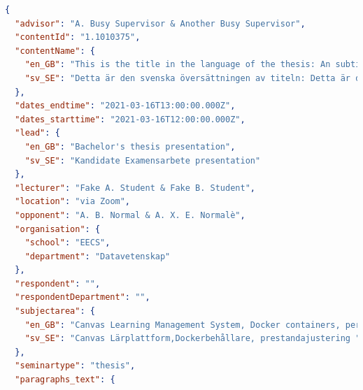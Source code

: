 \begin{lstlisting}[language={json}, caption={Response from the KTH Cortina API},label=lst:cortinaResponse]
{
  "advisor": "A. Busy Supervisor & Another Busy Supervisor",
  "contentId": "1.1010375",
  "contentName": {
    "en_GB": "This is the title in the language of the thesis: An subtitle in the language of the thesis",
    "sv_SE": "Detta är den svenska översättningen av titeln: Detta är den svenska översättningen av undertiteln"
  },
  "dates_endtime": "2021-03-16T13:00:00.000Z",
  "dates_starttime": "2021-03-16T12:00:00.000Z",
  "lead": {
    "en_GB": "Bachelor's thesis presentation",
    "sv_SE": "Kandidate Examensarbete presentation"
  },
  "lecturer": "Fake A. Student & Fake B. Student",
  "location": "via Zoom",
  "opponent": "A. B. Normal & A. X. E. Normalè",
  "organisation": {
    "school": "EECS",
    "department": "Datavetenskap"
  },
  "respondent": "",
  "respondentDepartment": "",
  "subjectarea": {
    "en_GB": "Canvas Learning Management System, Docker containers, performance tuning ",
    "sv_SE": "Canvas Lärplattform,Dockerbehållare, prestandajustering "
  },
  "seminartype": "thesis",
  "paragraphs_text": {

\end{lstlisting}
